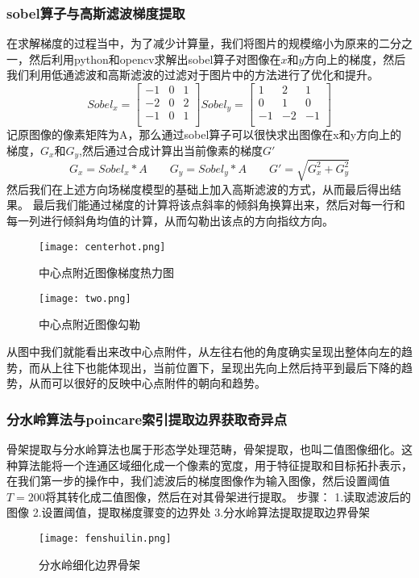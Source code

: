 \documentclass[withoutpreface,bwprint]{cumcmthesis} %
\begin{document}
\subsubsection{sobel算子与高斯滤波梯度提取}
在求解梯度的过程当中，为了减少计算量，我们将图片的规模缩小为原来的二分之一，然后利用python和opencv求解出sobel算子对图像在$x$和$y$方向上的梯度，然后我们利用低通滤波和高斯滤波的过滤对于图片中的方法进行了优化和提升。
\begin{equation}       %
Sobel_x= \begin{bmatrix}
-1 & 0 & 1\\
-2 & 0 & 2\\
-1 & 0 & 1\\
\end{bmatrix}   
Sobel_y= \begin{bmatrix}
1 & 2 & 1\\
0 & 1 & 0\\
-1 & -2 & -1\\
\end{bmatrix}           %
\end{equation}
记原图像的像素矩阵为A，那么通过sobel算子可以很快求出图像在x和y方向上的梯度，$G_x$和$G_y$,然后通过合成计算出当前像素的梯度$G'$
\begin{equation}
G_x=Sobel_x*A \qquad
G_y=Sobel_y*A \qquad
G'=\sqrt{G_x^2+G_y^2}
\end{equation}
然后我们在上述方向场梯度模型的基础上加入高斯滤波的方式，从而最后得出结果。
最后我们能通过梯度的计算将该点斜率的倾斜角换算出来，然后对每一行和每一列进行倾斜角均值的计算，从而勾勒出该点的方向指纹方向。
\begin{figure}[!h]
	\centering
	\texttt{[image: centerhot.png]}
	\caption{中心点附近图像梯度热力图}
\end{figure}
\begin{figure}[!h]
	\centering
	\texttt{[image: two.png]}
	\caption{中心点附近图像勾勒}
\end{figure}
\newpage
从图中我们就能看出来改中心点附件，从左往右他的角度确实呈现出整体向左的趋势，而从上往下也能体现出，当前位置下，呈现出先向上然后持平到最后下降的趋势，从而可以很好的反映中心点附件的朝向和趋势。
\newpage
\subsubsection{分水岭算法与poincare索引提取边界获取奇异点}
骨架提取与分水岭算法也属于形态学处理范畴，骨架提取，也叫二值图像细化。这种算法能将一个连通区域细化成一个像素的宽度，用于特征提取和目标拓扑表示，在我们第一步的操作中，我们滤波后的梯度图像作为输入图像，然后设置阈值$T=200$将其转化成二值图像，然后在对其骨架进行提取。
步骤：
1.读取滤波后的图像
2.设置阈值，提取梯度骤变的边界处
3.分水岭算法提取提取边界骨架
\begin{figure}[!h]
	\centering
	\texttt{[image: fenshuilin.png]}
	\caption{分水岭细化边界骨架}
\end{figure}
\end{document}
